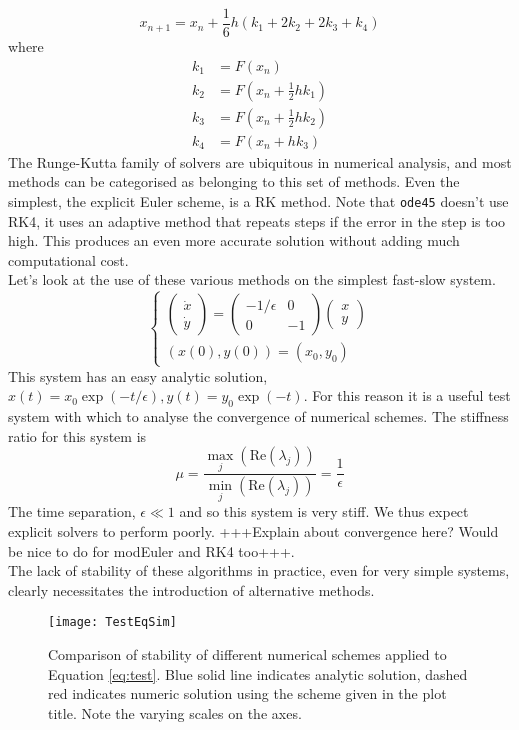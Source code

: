 $$ x_{n+1} = x_n +\frac{1}{6} h \left(k_1+2k_2+2k_3+k_4\right)$$
where
\begin{align*}
k_1 &= F(x_n)\\
k_2 &= F\left(x_n+\frac{1}{2}hk_1\right)\\
k_3 &= F\left(x_n +\frac{1}{2}hk_2\right)\\
k_4 &= F\left(x_n + hk_3\right)
\end{align*}
The Runge-Kutta family of solvers are ubiquitous in numerical analysis, and most methods can be categorised as belonging to this set of methods. Even the simplest, the explicit Euler scheme, is a RK method. Note that \texttt{ode45} doesn't use RK4, it uses an adaptive method that repeats steps if the error in the step is too high. This produces an even more accurate solution without adding much computational cost. \\

Let's look at the use of these various methods on the simplest fast-slow system.
		\begin{equation} \begin{cases}
		\begin{pmatrix} \dot{x}\\\dot{y}\end{pmatrix}=\begin{pmatrix}
		-1/\epsilon & 0 \\
		0& -1
		\end{pmatrix}\begin{pmatrix}
		x\\y 
		\end{pmatrix}\\
		(x(0),y(0))= (x_0,y_0)
		\end{cases}\label{eq:test}\end{equation}
This system has an easy analytic solution, $x(t) = x_0\exp(-t/\epsilon), y(t)=y_0 \exp(-t)$. For this reason it is a useful test system with which to analyse the convergence of numerical schemes. The stiffness ratio for this system is
$$ \mu =\frac{\max_j(\mathrm{Re}(\lambda_j))}{\min_j(\mathrm{Re}(\lambda_j))}= \frac{1}{\epsilon} $$
The time separation, $\epsilon \ll 1$ and so this system is very stiff. We thus expect explicit solvers to perform poorly. +++Explain about convergence here? Would be nice to do for modEuler and RK4 too+++.\\
The lack of stability of these algorithms in practice, even for very simple systems, clearly necessitates the introduction of alternative methods.
\begin{figure}
	\centering
	\texttt{[image: TestEqSim]}
	\caption[Numerical Stability Comparison]{Comparison of stability of different numerical schemes applied to Equation \ref{eq:test}. Blue solid line indicates analytic solution, dashed red indicates numeric solution using the scheme given in the plot title. Note the varying scales on the axes.}
	
\end{figure}

